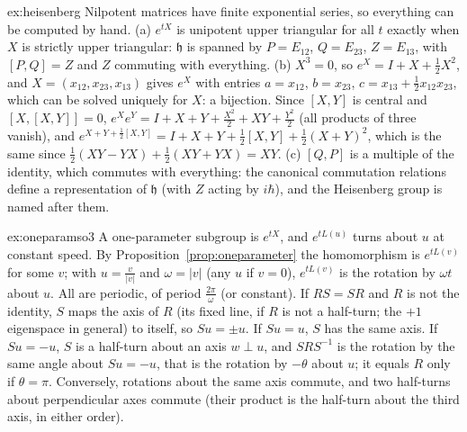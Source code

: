 \begin{solution}{ex:heisenberg}
\idea Nilpotent matrices have finite exponential series, so everything can be computed by hand.
\writeup (a) $e^{tX}$ is unipotent upper triangular for all $t$ exactly when $X$ is strictly upper triangular: $\mathfrak h$ is spanned by $P=E_{12}$, $Q=E_{23}$, $Z=E_{13}$, with $[P,Q]=Z$ and $Z$ commuting
with everything. (b) $X^3=0$, so $e^X=I+X+\frac12X^2$, and $X=(x_{12},x_{23},x_{13})$ gives $e^X$ with entries $a=x_{12}$, $b=x_{23}$, $c=x_{13}+\frac12x_{12}x_{23}$, which can be solved uniquely for $X$: a bijection. Since
$[X,Y]$ is central and $[X,[X,Y]]=0$, $e^Xe^Y=I+X+Y+\frac{X^2}2+XY+\frac{Y^2}2$ (all products of three vanish), and $e^{X+Y+\frac12[X,Y]}=I+X+Y+\frac12[X,Y]+\frac12(X+Y)^2$, which is the same since
$\frac12(XY-YX)+\frac12(XY+YX)=XY$. (c) $[Q,P]$ is a multiple of the identity, which commutes with everything: the canonical commutation relations define a representation of $\mathfrak h$ (with $Z$ acting
by $i\hbar$), and the Heisenberg group is named after them.
\end{solution}

\begin{solution}{ex:oneparamso3}
\idea A one-parameter subgroup is $e^{tX}$, and $e^{tL(u)}$ turns about $u$ at constant speed.
\writeup By Proposition~\ref{prop:oneparameter} the homomorphism is $e^{tL(v)}$ for some $v$; with $u=\frac v{|v|}$ and $\omega=|v|$ (any $u$ if $v=0$), $e^{tL(v)}$ is the rotation by $\omega t$ about $u$. All are periodic, of period $\frac{2\pi}\omega$
(or constant). If $RS=SR$ and $R$ is not the identity, $S$ maps the axis of $R$ (its fixed line, if $R$ is not a half-turn; the $+1$ eigenspace in general) to itself, so $Su=\pm u$. If $Su=u$, $S$ has the same axis. If
$Su=-u$, $S$ is a half-turn about an axis $w\perp u$, and $SRS^{-1}$ is the rotation by the same angle about $Su=-u$, that is the rotation by $-\theta$ about $u$; it equals $R$ only if $\theta=\pi$. Conversely, rotations
about the same axis commute, and two half-turns about perpendicular axes commute (their product is the half-turn about the third axis, in either order).
\end{solution}

